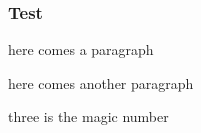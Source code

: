 \documentclass{beamer}
\begin{document}
\begin{frame}
  \frametitle{Test}
  \alert<+>{here comes a paragraph}

  \alert<+>{here comes another paragraph}

  \alert<+>{three is the magic number}
\end{frame}
\end{document}
